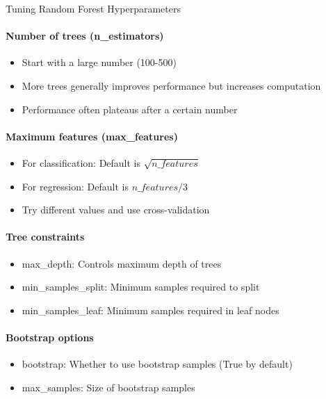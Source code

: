 \begin{KR}{Tuning Random Forest Hyperparameters}\\
\paragraph{Number of trees (n\_estimators)}
\begin{itemize}
    \item Start with a large number (100-500)
    \item More trees generally improves performance but increases computation
    \item Performance often plateaus after a certain number
\end{itemize}

\paragraph{Maximum features (max\_features)}
\begin{itemize}
    \item For classification: Default is $\sqrt{n\_features}$
    \item For regression: Default is $n\_features/3$
    \item Try different values and use cross-validation
\end{itemize}

\paragraph{Tree constraints}
\begin{itemize}
    \item max\_depth: Controls maximum depth of trees
    \item min\_samples\_split: Minimum samples required to split
    \item min\_samples\_leaf: Minimum samples required in leaf nodes
\end{itemize}

\paragraph{Bootstrap options}
\begin{itemize}
    \item bootstrap: Whether to use bootstrap samples (True by default)
    \item max\_samples: Size of bootstrap samples
\end{itemize}
\end{KR}

